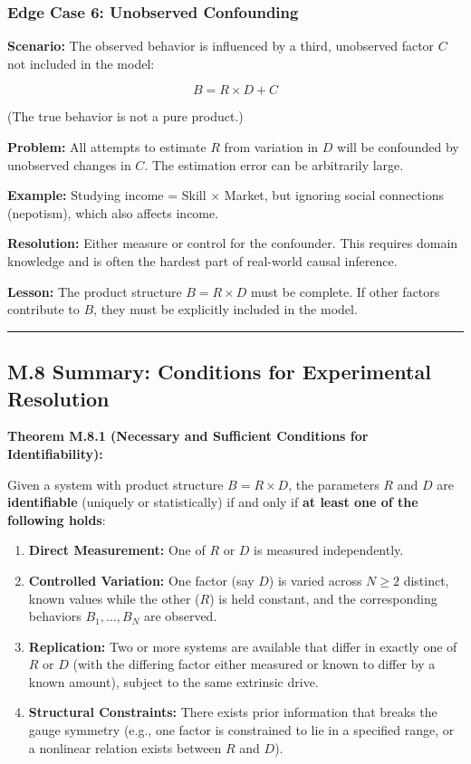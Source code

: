 \documentclass[
]{article}
\providecommand{\tightlist}{%
  \setlength{\itemsep}{0pt}\setlength{\parskip}{0pt}}
\begin{document}
\subsubsection{Edge Case 6: Unobserved
Confounding}\label{edge-case-6-unobserved-confounding}

\textbf{Scenario:} The observed behavior is influenced by a third,
unobserved factor \(C\) not included in the model:

\[B = R \times D + C\]

(The true behavior is not a pure product.)

\textbf{Problem:} All attempts to estimate \(R\) from variation in \(D\)
will be confounded by unobserved changes in \(C\). The estimation error
can be arbitrarily large.

\textbf{Example:} Studying income = Skill × Market, but ignoring social
connections (nepotism), which also affects income.

\textbf{Resolution:} Either measure or control for the confounder. This
requires domain knowledge and is often the hardest part of real-world
causal inference.

\textbf{Lesson:} The product structure \(B = R \times D\) must be
complete. If other factors contribute to \(B\), they must be explicitly
included in the model.

\begin{center}\rule{0.5\linewidth}{0.5pt}\end{center}

\subsection{M.8 Summary: Conditions for Experimental
Resolution}\label{m.8-summary-conditions-for-experimental-resolution}

\textbf{Theorem M.8.1 (Necessary and Sufficient Conditions for
Identifiability):}

Given a system with product structure \(B = R \times D\), the parameters
\(R\) and \(D\) are \textbf{identifiable} (uniquely or statistically) if
and only if \textbf{at least one of the following holds}:

\begin{enumerate}
\def\labelenumi{\arabic{enumi}.}
\tightlist
\item
  \textbf{Direct Measurement:} One of \(R\) or \(D\) is measured
  independently.
\item
  \textbf{Controlled Variation:} One factor (say \(D\)) is varied across
  \(N \geq 2\) distinct, known values while the other (\(R\)) is held
  constant, and the corresponding behaviors \(B_1, \ldots, B_N\) are
  observed.
\item
  \textbf{Replication:} Two or more systems are available that differ in
  exactly one of \(R\) or \(D\) (with the differing factor either
  measured or known to differ by a known amount), subject to the same
  extrinsic drive.
\item
  \textbf{Structural Constraints:} There exists prior information that
  breaks the gauge symmetry (e.g., one factor is constrained to lie in a
  specified range, or a nonlinear relation exists between \(R\) and
  \(D\)).
\end{enumerate}
\end{document}
